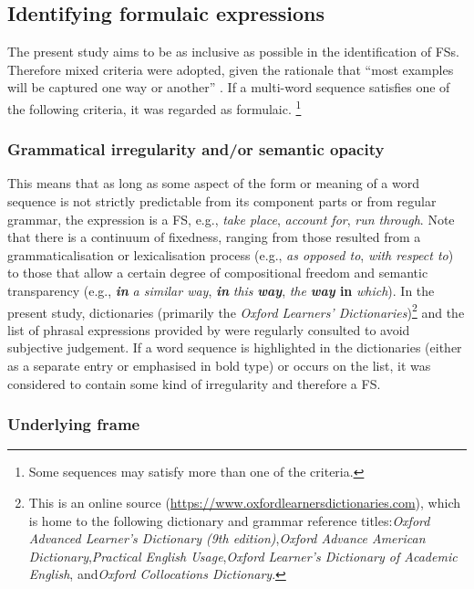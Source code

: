 \documentclass[output=paper]{langscibook}
\begin{document}
\subsection{Identifying formulaic expressions}

The present study aims to be as inclusive as possible in the identification of FSs. Therefore mixed criteria were adopted, given the rationale that “most examples will be captured one way or another” \citep[110]{Wray2008}. If a multi-word sequence satisfies one of the following criteria, it was regarded as formulaic. \footnote{{Some sequences may satisfy more than one of the criteria.}}

\subsubsection{Grammatical irregularity and/or semantic opacity \citep{Wray2008,SchneiderEtAl2014,Herbst2015}}

This means that as long as some aspect of the form or meaning of a word sequence is not strictly predictable from its component parts or from regular grammar, the expression is a FS, e.g., \textit{take place}, \textit{account for}, \textit{run through}. Note that there is a continuum of fixedness, ranging from those resulted from a grammaticalisation or lexicalisation process (e.g., \textit{as opposed to}, \textit{with respect to}) to those that allow a certain degree of compositional freedom and semantic transparency (e.g., \textbf{\textit{in}} \textit{a similar way}, \textbf{\textit{in}} \textit{this} \textbf{\textit{way}}, \textit{the} \textbf{\textit{way} \textbf{in}} \textit{which}). In the present study, dictionaries (primarily the \textit{Oxford Learners’ Dictionaries})\footnote{{This is an online source (}\url{https://www.oxfordlearnersdictionaries.com}\textrm{), which is home to the following dictionary and grammar reference titles:}{\textit{Oxford Advanced Learner’s Dictionary (9th edition)}},{\textit{Oxford Advance American Dictionary}},{\textit{Practical English Usage}},{\textit{Oxford Learner’s Dictionary of Academic English}}\textrm{, and}{\textit{Oxford Collocations Dictionary}}.} and the list of phrasal expressions provided by \citet{MartinezSchmitt2012} were regularly consulted to avoid subjective judgement. If a word sequence is highlighted in the dictionaries (either as a separate entry or emphasised in bold type) or occurs on the list, it was considered to contain some kind of irregularity and therefore a FS.

\subsubsection{Underlying frame \citep{Wray2008}}
\end{document}
